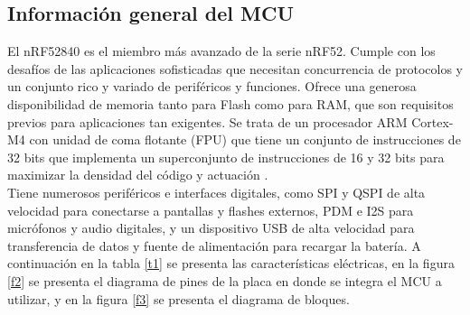 \subsection{Información general del MCU}

El nRF52840 es el miembro más avanzado de la serie nRF52. Cumple con los desafíos de las aplicaciones sofisticadas que necesitan concurrencia de protocolos y un conjunto rico y variado de periféricos y funciones. Ofrece una generosa disponibilidad de memoria tanto para Flash como para RAM, que son requisitos previos para aplicaciones tan exigentes\cite{mcu}.
Se trata de un procesador ARM Cortex-M4 con unidad de coma flotante (FPU) que tiene un conjunto de instrucciones de 32 bits que implementa un superconjunto de instrucciones de 16 y 32 bits para maximizar la densidad del código y
actuación \cite{mcu}.\\
Tiene numerosos periféricos e interfaces digitales, como SPI y QSPI de alta velocidad para conectarse a pantallas y flashes externos, PDM e I2S para micrófonos y audio digitales, y un dispositivo USB de alta velocidad para transferencia de datos y fuente de alimentación para recargar la batería\cite{mcu}. A continuación en la tabla \ref{t1} se presenta las características eléctricas, en la figura \ref{f2} se presenta el diagrama de pines de la placa en donde se integra el MCU a utilizar, y en la figura \ref{f3} se presenta el diagrama de bloques. 


